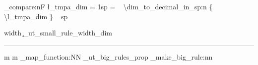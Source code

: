 {{{\begin{minipage} [ t ] { \l_tmpb_dim }
{{               }
               \dim_compare:nF { \l_tmpa_dim = 1sp } {
                   = ~ \SI { \dim_to_decimal_in_sp:n { \l_tmpa_dim } } { sp }
               }
         }
         \par \vspace{ \c_ut_inner_sep_dim }
      \end{minipage}
      \hspace { \c_ut_inner_sep_dim }
       {
         { \color { l_ut_fill_color ! 26 } \vrule width \c_ut_small_rule_width_dim }
         \hspace { -\c_ut_small_rule_width_dim }
         \color { l_ut_fill_color }
         \rule
            [ \dim_eval:n { -\l_tmpa_dim + \c_ut_inner_sep_dim } ]
            { \c_ut_small_rule_width_dim }
            { \l_tmpa_dim }
      }
   }%
} }
\NewDocumentCommand { \DrawRule } { m m } {
   \hspace  { -\c_ut_big_rule_box_width_dim }
}
\NewDocumentCommand{ \DrawRules } {  } {
   \prop_map_function:NN \g_ut_big_rules_prop \ut_make_big_rule:nn
}

\ExplSyntaxOff%
